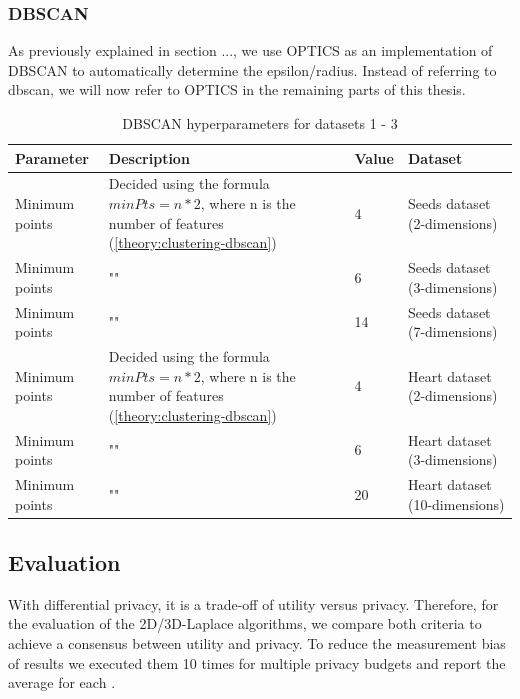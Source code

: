 \subsubsection{DBSCAN}
As previously explained in section ..., we use OPTICS as an implementation of DBSCAN to automatically determine the epsilon/radius.
Instead of referring to \gls{dbscan}, we will now refer to OPTICS in the remaining parts of this thesis.
\begin{table}[h]
  \begin{tabular}{|l|p{6cm}|l|l|}
    \hline
    Parameter      & Description                                                                                                    & Value & Dataset                       \\
    \hline
    Minimum points & Decided using the formula $minPts = n * 2$, where n is the number of features (\ref{theory:clustering-dbscan}) & 4     & Seeds dataset (2-dimensions)  \\
    \hline
    Minimum points & ""                                                                                                             & 6     & Seeds dataset (3-dimensions)  \\
    \hline
    Minimum points & ""                                                                                                             & 14    & Seeds dataset (7-dimensions)  \\
    \hline
    Minimum points & Decided using the formula $minPts = n * 2$, where n is the number of features (\ref{theory:clustering-dbscan}) & 4     & Heart dataset (2-dimensions)  \\
    \hline
    Minimum points & ""                                                                                                             & 6     & Heart dataset (3-dimensions)  \\
    \hline
    Minimum points & ""                                                                                                             & 20    & Heart dataset (10-dimensions) \\
    \hline
  \end{tabular}
  \caption{DBSCAN  hyperparameters for datasets 1 - 3}
  \label{tab:dbscan-formula-sklearn}
\end{table}

\newpage
\subsection{Evaluation}
With differential privacy, it is a trade-off of utility versus privacy.
Therefore, for the evaluation of the 2D/3D-Laplace algorithms, we compare both criteria to achieve a consensus between utility and privacy.
To reduce the measurement bias of results we executed them 10 times for multiple privacy budgets and report the average for each \citep{9679364}.

